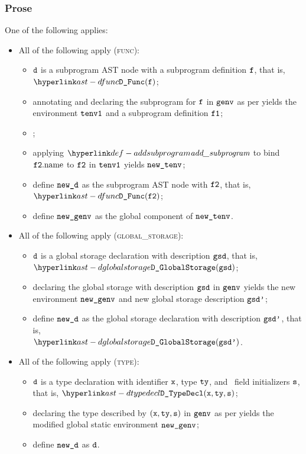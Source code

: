 \subsubsection{Prose}
One of the following applies:
\begin{itemize}
  \item All of the following apply (\textsc{func}):
  \begin{itemize}
    \item $\texttt{d}$ is a subprogram AST node with a subprogram definition $\texttt{f}$, that is, $\DFunc(\vf)$;
    \item annotating and declaring the subprogram for $\texttt{f}$ in $\texttt{genv}$ as per 
          yields the environment $\texttt{tenv1}$ and a subprogram definition $\vfone$\ProseOrTypeError;
    \item \Proseannotatesubprogram{$\vfone$}{$\tenv$}{$\vftwo$\ProseOrTypeError};
    \item applying $\addsubprogram$ to bind $\texttt{f2}.\text{name}$ to $\vftwo$ in $\texttt{tenv1}$ yields $\texttt{new\_tenv}$;
    \item define $\texttt{new\_d}$ as the subprogram AST node with $\vftwo$, that is, $\DFunc(\vftwo)$;
    \item define $\texttt{new\_genv}$ as the global component of $\texttt{new\_tenv}$.
  \end{itemize}

  \item All of the following apply (\textsc{global\_storage}):
  \begin{itemize}
    \item $\texttt{d}$ is a global storage declaration with description $\texttt{gsd}$, that is, \\ $\DGlobalStorage(\gsd)$;
    \item declaring the global storage with description $\texttt{gsd}$ in $\texttt{genv}$ yields the new environment
          $\texttt{new\_genv}$ and new global storage description $\texttt{gsd'}$\ProseOrTypeError;
    \item define $\texttt{new\_d}$ as the global storage declaration with description $\texttt{gsd'}$, that is, \\ $\DGlobalStorage(\gsdp)$.
  \end{itemize}

  \item All of the following apply (\textsc{type}):
  \begin{itemize}
    \item $\texttt{d}$ is a type declaration with identifier $\texttt{x}$, type $\texttt{ty}$,
          and \optional\ field initializers $\texttt{s}$, that is, $\DTypeDecl(\vx, \tty, \vs)$;
    \item declaring the type described by $(\texttt{x}, \texttt{ty}, \texttt{s})$ in $\texttt{genv}$
          as per  yields the modified global static environment $\texttt{new\_genv}$\ProseOrTypeError;
    \item define $\texttt{new\_d}$ as $\texttt{d}$.
  \end{itemize}
\end{itemize}

